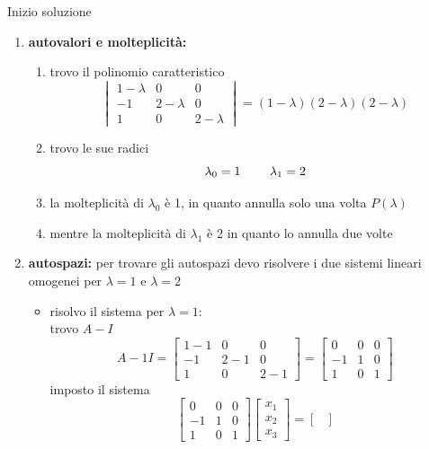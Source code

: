 \documentclass[italian]{article}
\begin{document}
\noindent
Inizio soluzione
\begin{enumerate}[label=\textbf{\alph*)}]
	\item \textbf{autovalori e molteplicità:}
		\begin{enumerate}[label=\arabic*.]
			\item trovo il polinomio caratteristico
			\[
				\begin{vmatrix}
					1-\lambda & 0 & 0 \\
					-1 & 2-\lambda & 0 \\
					1 & 0 & 2-\lambda
				\end{vmatrix}
				=
				(1-\lambda)(2-\lambda)(2-\lambda)
			\]
			\item trovo le sue radici 
				\[
					\lambda_0 = 1$ \qquad $\lambda_1 = 2
				\]
			\item la molteplicità di $\lambda_0$ è 1, in quanto annulla solo una volta $P(\lambda)$
			\item mentre la molteplicità di $\lambda_1$ è 2 in quanto lo annulla due volte
		\end{enumerate}
	\pagebreak
	\item \textbf{autospazi:} per trovare gli autospazi devo risolvere i due sistemi lineari omogenei per $\lambda=1$ e $\lambda=2$
		\begin{itemize}
			\item risolvo il sistema per $\lambda=1$:\\[2mm]
				trovo $A - I$
				\[
					A - 1I =
					\begin{bmatrix}
						1-1 & 0 & 0 \\
						-1 & 2-1 & 0 \\
						1 & 0 & 2-1
					\end{bmatrix}
					=
					\begin{bmatrix}
						0 & 0 & 0 \\
						-1 & 1 & 0 \\
						1 & 0 & 1
					\end{bmatrix}
				\]
				imposto il sistema
				\[
					\begin{bmatrix}
						0 & 0 & 0 \\
						-1 & 1 & 0 \\
						1 & 0 & 1
					\end{bmatrix}
					\begin{bmatrix}
						x_1 \\ x_2 \\ x_3
					\end{bmatrix}
					=
					\begin{bmatrix}

\end{bmatrix}\]
\end{itemize}
\end{enumerate}
\end{document}
